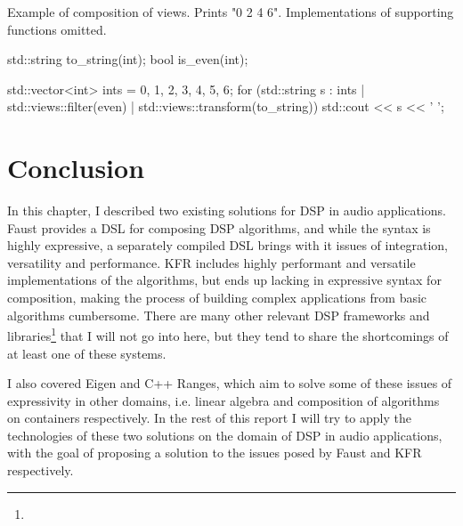 \begin{listing}
  \caption{Example of composition of views. Prints "0 2 4 6". Implementations of supporting functions omitted.}
  \label{rangesviewsex}
  \begin{cppcodenl}
  std::string to_string(int);
  bool is_even(int);

  std::vector<int> ints = {0, 1, 2, 3, 4, 5, 6};
  for (std::string s : ints | std::views::filter(even) | std::views::transform(to_string)) {
      std::cout << s << ' ';
  }
  \end{cppcodenl}
\end{listing}

\section{Conclusion}

In this chapter, I described two existing solutions for DSP in audio applications. Faust provides a DSL for
composing DSP algorithms, and while the syntax is highly expressive, a separately compiled DSL brings with it
issues of integration, versatility and performance. KFR includes highly performant and versatile
implementations of the algorithms, but ends up lacking in expressive syntax for composition, making the
process of building complex applications from basic algorithms cumbersome. There are many other relevant DSP
frameworks and libraries\footnote{} that I will not go into here, but they tend to share the
shortcomings of at least one of these systems.

I also covered Eigen and C++ Ranges, which aim to solve some of these issues of expressivity in other
domains, i.e. linear algebra and composition of algorithms on containers respectively. In the rest of this
report I will try to apply the technologies of these two solutions on the domain of DSP in audio
applications, with the goal of proposing a solution to the issues posed by Faust and KFR respectively.
